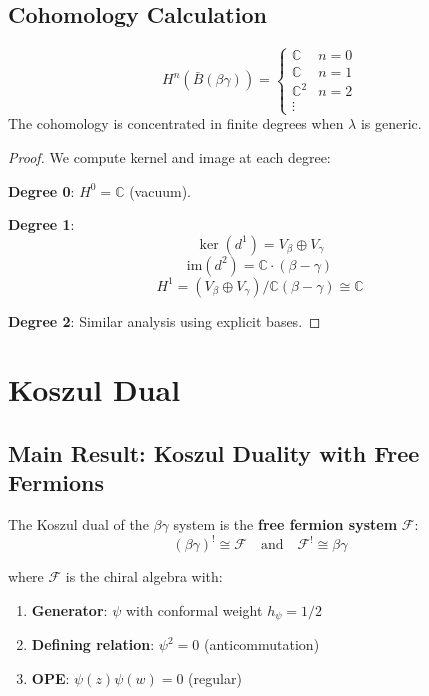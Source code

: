 \subsection{Cohomology Calculation}

\begin{theorem}
$$H^n(\bar{B}(\beta\gamma)) = \begin{cases}
\mathbb{C} & n = 0 \\
\mathbb{C} & n = 1 \\
\mathbb{C}^2 & n = 2 \\
\vdots
\end{cases}$$
The cohomology is concentrated in finite degrees when $\lambda$ is generic.
\end{theorem}

\begin{proof}
We compute kernel and image at each degree:

\textbf{Degree 0}: $H^0 = \mathbb{C}$ (vacuum).

\textbf{Degree 1}: 
$$\ker(d^1) = V_\beta \oplus V_\gamma$$
$$\text{im}(d^2) = \mathbb{C} \cdot (\beta - \gamma)$$
$$H^1 = (V_\beta \oplus V_\gamma)/\mathbb{C}(\beta - \gamma) \cong \mathbb{C}$$

\textbf{Degree 2}: Similar analysis using explicit bases.
\end{proof}

\section{Koszul Dual}
\label{sec:betagamma-koszul-dual}

\subsection{Main Result: Koszul Duality with Free Fermions}

\begin{theorem}
\label{thm:betagamma-fermion-koszul}
The Koszul dual of the $\beta\gamma$ system is the \textbf{free fermion system} $\mathcal{F}$:
$$(\beta\gamma)^! \cong \mathcal{F} \quad \text{and} \quad \mathcal{F}^! \cong \beta\gamma$$

where $\mathcal{F}$ is the chiral algebra with:
\begin{enumerate}
\item \textbf{Generator}: $\psi$ with conformal weight $h_\psi = 1/2$
\item \textbf{Defining relation}: $\psi^2 = 0$ (anticommutation)
\item \textbf{OPE}: $\psi(z)\psi(w) = 0$ (regular)
\end{enumerate}
\end{theorem}

